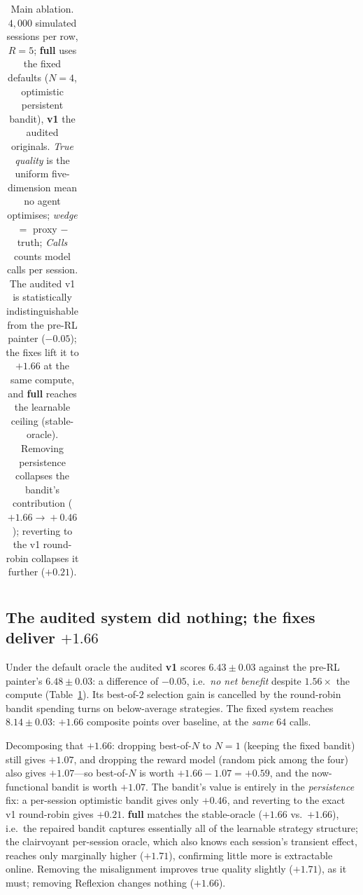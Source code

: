 \documentclass[11pt]{article}
\newcommand{\full}{\textbf{full}}
\theoremstyle{plain}
\theoremstyle{definition}
\begin{document}
\begin{table}[t]
{\begin{tabular}{@{}lcccccc@{}}
\bottomrule
\end{tabular}}
\caption{Main ablation. $4{,}000$ simulated sessions per row, $R{=}5$; \textbf{full}
uses the fixed defaults ($N{=}4$, optimistic persistent bandit), \textbf{v1} the
audited originals. \emph{True quality} is the uniform five-dimension mean no agent
optimises; \emph{wedge} $=$ proxy $-$ truth; \emph{Calls} counts model calls per
session. The audited v1 is statistically indistinguishable from the pre-RL
painter ($-0.05$); the fixes lift it to $+1.66$ at the same compute, and \full{}
reaches the learnable ceiling (stable-oracle). Removing persistence collapses the
bandit's contribution ($+1.66\!\to\!+0.46$); reverting to the v1 round-robin
collapses it further ($+0.21$).}
\label{tab:main}
\end{table}

\subsection{The audited system did nothing; the fixes deliver $+1.66$}
Under the default oracle the audited \textbf{v1} scores $6.43 \pm 0.03$ against
the pre-RL painter's $6.48 \pm 0.03$: a difference of $-0.05$, i.e.\ \emph{no net
benefit} despite $1.56\times$ the compute (Table~\ref{tab:main}). Its best-of-$2$
selection gain is cancelled by the round-robin bandit spending turns on
below-average strategies. The fixed system reaches $8.14 \pm 0.03$: $+1.66$
composite points over baseline, at the \emph{same} $64$ calls.

Decomposing that $+1.66$: dropping best-of-$N$ to $N{=}1$ (keeping the fixed
bandit) still gives $+1.07$, and dropping the reward model (random pick among the
four) also gives $+1.07$---so best-of-$N$ is worth $+1.66-1.07 = +0.59$, and the
now-functional bandit is worth $+1.07$. The bandit's value is entirely in the
\emph{persistence} fix: a per-session optimistic bandit gives only $+0.46$, and
reverting to the exact v1 round-robin gives $+0.21$. \full{} matches the
stable-oracle ($+1.66$ vs.\ $+1.66$), i.e.\ the repaired bandit captures
essentially all of the learnable strategy structure; the clairvoyant per-session
oracle, which also knows each session's transient effect, reaches only marginally
higher ($+1.71$), confirming little more is extractable online. Removing the
misalignment improves true quality slightly ($+1.71$), as it must; removing
Reflexion changes nothing ($+1.66$).
\end{document}
